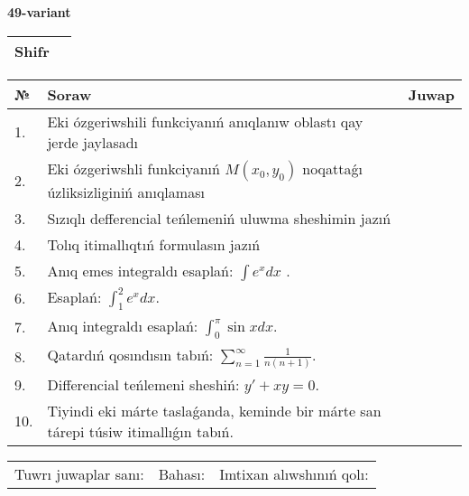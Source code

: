 \documentclass{article}
\begin{document}
  \egroup
  
  \newpage
  
  
  \textbf{49-variant}\\
  
  \bgroup
  \def\arraystretch{1.6} %
  
  \begin{tabular}{|m{5.7cm}|m{9.5cm}|}
  \hline
  Shifr & \\
  \hline
  \end{tabular}
  
  \vspace{1cm}
  
  \begin{tabular}{|m{0.7cm}|m{10cm}|m{4cm}|}
  \hline
  № & Soraw & Juwap \\
  \hline
  1. & Eki ózgeriwshili funkciyanıń anıqlanıw oblastı qay jerde jaylasadı &  \\
  \hline
  2. & Eki ózgeriwshli funkciyanıń \(M(x_{0}, y_{0})\) noqattaǵı úzliksizliginiń anıqlaması &  \\
  \hline
  3. & Sızıqlı defferencial teńlemeniń uluwma sheshimin jazıń &  \\
  \hline
  4. & Tolıq itimallıqtıń formulasın jazıń &  \\
  \hline
  5. & Anıq emes integraldı esaplań: \(\int{e^{x}dx}\) . &  \\
  \hline
  6. & Esaplań: \(\int_{1}^2 {e^{x}dx}\). &  \\
  \hline
  7. & Anıq integraldı esaplań: \(\int_{0}^{\pi}{\sin xdx}\). &  \\
  \hline
  8. & Qatardıń qosındısın tabıń: \(\sum_{n = 1}^{\infty}\frac{1}{n(n + 1)}\). &  \\
  \hline
  9. & Differencial teńlemeni sheshiń: \(y' + xy = 0\). &  \\
  \hline
  10. & Tiyindi eki márte taslaǵanda, keminde bir márte san tárepi túsiw itimallıǵın tabıń. &  \\
  \hline
  \end{tabular}
  
  \vspace{1cm}
  
  \begin{tabular}{lll}
  Tuwrı juwaplar sanı: \underline{\hspace{1.5cm}} & 
  Bahası: \underline{\hspace{1.5cm}} & 
  Imtixan alıwshınıń qolı: \underline{\hspace{2cm}} \\
  \end{tabular}
  
\end{document}
